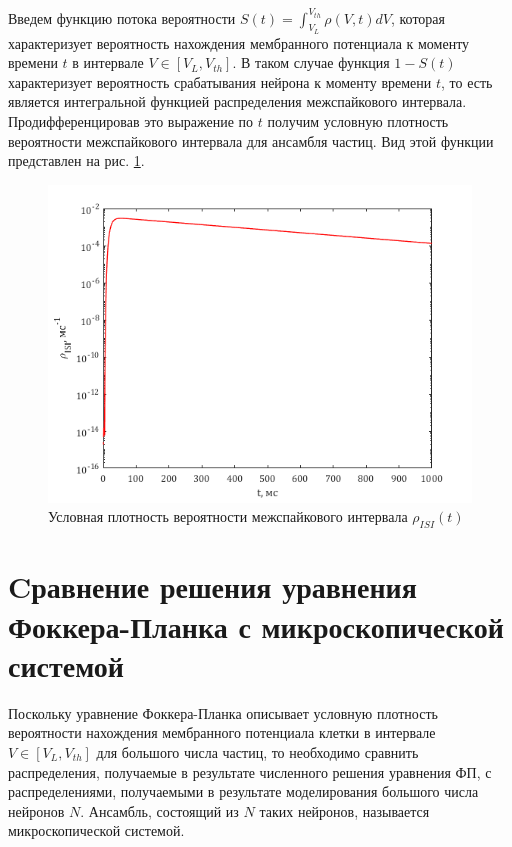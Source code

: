 Введем функцию потока вероятности $\displaystyle S(t)=\int_{V_L}^{V_{th}}\rho(V,t)dV$, которая характеризует вероятность нахождения мембранного потенциала к моменту времени $t$ в интервале $V\in[V_L, V_{th}]$. В таком случае функция $1-S(t)$ характеризует вероятность срабатывания нейрона к моменту времени $t$, то есть является интегральной функцией распределения межспайкового интервала. Продифференцировав это выражение по $t$ получим условную плотность вероятности межспайкового интервала для ансамбля частиц. Вид этой функции представлен на рис. \ref{pic:2}.
\begin{figure}[H]
	\centering
	\includegraphics[width=\linewidth]{pic/S.png}
	\caption{Условная плотность вероятности межспайкового интервала $\rho_{ISI}(t)$}
	\label{pic:2}
\end{figure}
\section{Cравнение решения уравнения Фоккера-Планка с микроскопической системой}
Поскольку уравнение Фоккера-Планка описывает условную плотность вероятности нахождения мембранного потенциала клетки в интервале $V\in[V_L, V_{th}]$ для большого числа частиц, то необходимо сравнить распределения, получаемые в результате численного решения уравнения ФП, с распределениями, получаемыми в результате моделирования большого числа нейронов $N$. Ансамбль, состоящий из $N$ таких нейронов, называется микроскопической системой.

